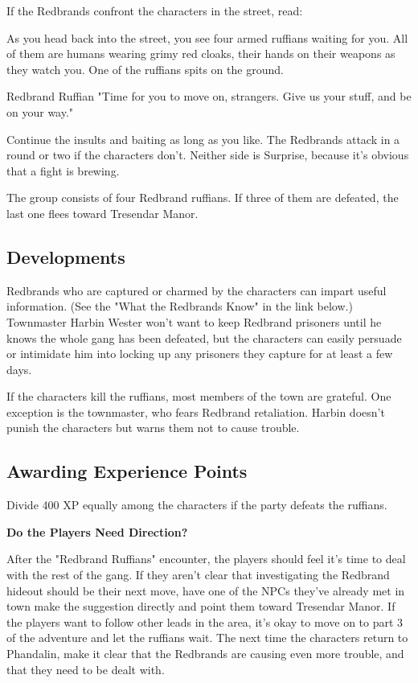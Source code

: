 \documentclass[10pt,a4paper,twoside,bg=print,twocolumn,openany,nodeprecatedcode]{dndbook}
\begin{document}
If the Redbrands confront the characters in the street, read:

\begin{DndSidebar}[float=!b]{}
As you head back into the street, you see four armed ruffians waiting for you. All of them are humans wearing grimy red cloaks, their hands on their weapons as they watch you. One of the ruffians spits on the ground.



\end{DndSidebar}

\begin{DndSidebar}[float=!b]{Redbrand Ruffian}
"Time for you to move on, strangers. Give us your stuff, and be on your way."



\end{DndSidebar}

Continue the insults and baiting as long as you like. The Redbrands attack in a round or two if the characters don't. Neither side is Surprise, because it's obvious that a fight is brewing.

The group consists of four Redbrand ruffians. If three of them are defeated, the last one flees toward Tresendar Manor.

\subsection{Developments}
Redbrands who are captured or charmed by the characters can impart useful information. (See the "What the Redbrands Know" in the link below.) Townmaster Harbin Wester won't want to keep Redbrand prisoners until he knows the whole gang has been defeated, but the characters can easily persuade or intimidate him into locking up any prisoners they capture for at least a few days.

If the characters kill the ruffians, most members of the town are grateful. One exception is the townmaster, who fears Redbrand retaliation. Harbin doesn't punish the characters but warns them not to cause trouble.

\subsection{Awarding Experience Points}
Divide 400 XP equally among the characters if the party defeats the ruffians.

\textbf{Do the Players Need Direction?}

After the "Redbrand Ruffians" encounter, the players should feel it's time to deal with the rest of the gang. If they aren't clear that investigating the Redbrand hideout should be their next move, have one of the NPCs they've already met in town make the suggestion directly and point them toward Tresendar Manor. If the players want to follow other leads in the area, it's okay to move on to part 3 of the adventure and let the ruffians wait. The next time the characters return to Phandalin, make it clear that the Redbrands are causing even more trouble, and that they need to be dealt with.
\end{document}
